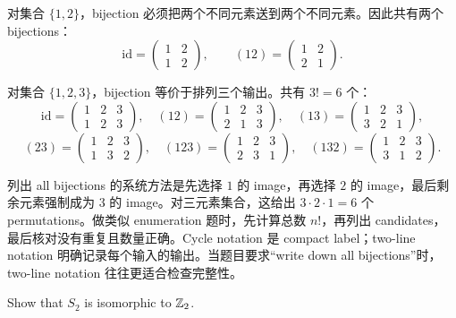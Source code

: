 \begin{solution}
对集合 \(\{1,2\}\)，bijection 必须把两个不同元素送到两个不同元素。因此共有两个 bijections：
\[
  \mathrm{id}=\begin{pmatrix}1&2\\1&2\end{pmatrix},
  \qquad
  (12)=\begin{pmatrix}1&2\\2&1\end{pmatrix}.
\]

对集合 \(\{1,2,3\}\)，bijection 等价于排列三个输出。共有 \(3!=6\) 个：
\[
  \mathrm{id}=\begin{pmatrix}1&2&3\\1&2&3\end{pmatrix},
  \quad
  (12)=\begin{pmatrix}1&2&3\\2&1&3\end{pmatrix},
  \quad
  (13)=\begin{pmatrix}1&2&3\\3&2&1\end{pmatrix},
\]
\[
  (23)=\begin{pmatrix}1&2&3\\1&3&2\end{pmatrix},
  \quad
  (123)=\begin{pmatrix}1&2&3\\2&3&1\end{pmatrix},
  \quad
  (132)=\begin{pmatrix}1&2&3\\3&1&2\end{pmatrix}.
\]
\end{solution}

\begin{explanation}
列出 all bijections 的系统方法是先选择 \(1\) 的 image，再选择 \(2\) 的 image，最后剩余元素强制成为 \(3\) 的 image。对三元素集合，这给出 \(3\cdot2\cdot1=6\) 个 permutations。做类似 enumeration 题时，先计算总数 \(n!\)，再列出 candidates，最后核对没有重复且数量正确。Cycle notation 是 compact label；two-line notation 明确记录每个输入的输出。当题目要求“write down all bijections”时，two-line notation 往往更适合检查完整性。
\end{explanation}

\begin{exerciseblock}
Show that \(S_2\) is isomorphic to \(\mathbb{Z}_2\).
\end{exerciseblock}

